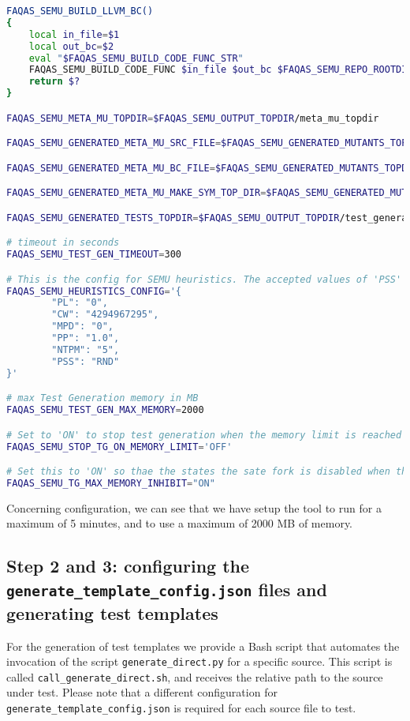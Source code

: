 \begin{lstlisting}[language=bash,label=listing:ESAIL:conf,caption=faqas\_semus\_conf.sh file for ESAIL case study.]
FAQAS_SEMU_BUILD_LLVM_BC()
{
    local in_file=$1
    local out_bc=$2
    eval "$FAQAS_SEMU_BUILD_CODE_FUNC_STR"
    FAQAS_SEMU_BUILD_CODE_FUNC $in_file $out_bc $FAQAS_SEMU_REPO_ROOTDIR clang '-c -emit-llvm'
    return $?
}

FAQAS_SEMU_META_MU_TOPDIR=$FAQAS_SEMU_OUTPUT_TOPDIR/meta_mu_topdir

FAQAS_SEMU_GENERATED_META_MU_SRC_FILE=$FAQAS_SEMU_GENERATED_MUTANTS_TOPDIR/"${ENV_FAQAS_SEMU_SRC_FILE%.c}".MetaMu.c

FAQAS_SEMU_GENERATED_META_MU_BC_FILE=$FAQAS_SEMU_GENERATED_MUTANTS_TOPDIR/"${ENV_FAQAS_SEMU_SRC_FILE%.c}".MetaMu.bc

FAQAS_SEMU_GENERATED_META_MU_MAKE_SYM_TOP_DIR=$FAQAS_SEMU_GENERATED_MUTANTS_TOPDIR/"MakeSym-TestGen-Input"

FAQAS_SEMU_GENERATED_TESTS_TOPDIR=$FAQAS_SEMU_OUTPUT_TOPDIR/test_generation

# timeout in seconds
FAQAS_SEMU_TEST_GEN_TIMEOUT=300

# This is the config for SEMU heuristics. The accepted values of 'PSS' are 'RND' for random and 'MDO' for minimum distance to output
FAQAS_SEMU_HEURISTICS_CONFIG='{
        "PL": "0",
        "CW": "4294967295",
        "MPD": "0",
        "PP": "1.0",
        "NTPM": "5",
        "PSS": "RND"
}'

# max Test Generation memory in MB
FAQAS_SEMU_TEST_GEN_MAX_MEMORY=2000

# Set to 'ON' to stop test generation when the memory limit is reached
FAQAS_SEMU_STOP_TG_ON_MEMORY_LIMIT='OFF'

# Set this to 'ON' so thae the states the sate fork is disabled when the memory limit is reached, to avoid going much over it
FAQAS_SEMU_TG_MAX_MEMORY_INHIBIT="ON"
\end{lstlisting}

Concerning \SEMU configuration, we can see that we have setup the tool to run for a maximum of 5 minutes, and to use a maximum of 2000 MB of memory.

\subsection{Step 2 and 3: configuring the \texttt{generate\_template\_config.json} files and generating test templates}

For the generation of test templates we provide a Bash script that automates the invocation of the script \texttt{generate\_direct.py} for a specific source. This script is called \texttt{call\_generate\_direct.sh}, and receives the relative path to the source under test.
Please note that a different configuration for \texttt{generate\_template\_config.json} is required for each source file to test.

